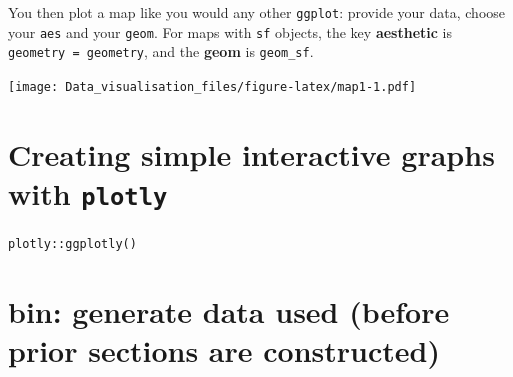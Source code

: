 \documentclass[]{book}
\newenvironment{Shaded}{\begin{snugshade}}{\end{snugshade}}
\newcommand{\DataTypeTok}[1]{\textcolor[rgb]{0.13,0.29,0.53}{#1}}
\newcommand{\DecValTok}[1]{\textcolor[rgb]{0.00,0.00,0.81}{#1}}
\newcommand{\KeywordTok}[1]{\textcolor[rgb]{0.13,0.29,0.53}{\textbf{#1}}}
\newcommand{\NormalTok}[1]{#1}
\newcommand{\OperatorTok}[1]{\textcolor[rgb]{0.81,0.36,0.00}{\textbf{#1}}}
\newcommand{\OtherTok}[1]{\textcolor[rgb]{0.56,0.35,0.01}{#1}}
\newcommand{\StringTok}[1]{\textcolor[rgb]{0.31,0.60,0.02}{#1}}
\begin{document}
You then plot a map like you would any other \texttt{ggplot}: provide your data, choose your \texttt{aes} and your \texttt{geom}. For maps with \texttt{sf} objects, the key \textbf{aesthetic} is \texttt{geometry\ =\ geometry}, and the \textbf{geom} is \texttt{geom\_sf}.

\begin{Shaded}
\end{Shaded}

\texttt{[image: Data\_visualisation\_files/figure-latex/map1-1.pdf]}

\hypertarget{creating-simple-interactive-graphs-with-plotly}{%
\section{\texorpdfstring{Creating simple interactive graphs with \texttt{plotly}}{Creating simple interactive graphs with plotly}}\label{creating-simple-interactive-graphs-with-plotly}}

\texttt{plotly::ggplotly()}

\hypertarget{bin-generate-data-used-before-prior-sections-are-constructed}{%
\section{bin: generate data used (before prior sections are constructed)}\label{bin-generate-data-used-before-prior-sections-are-constructed}}
\end{document}
